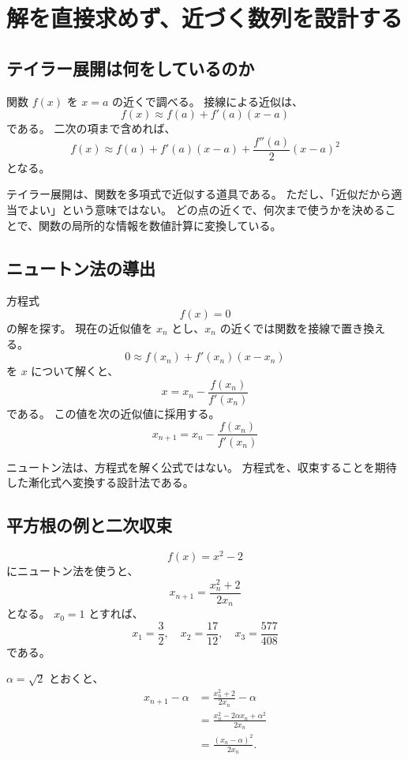 
\section{解を直接求めず、近づく数列を設計する}

\subsection{テイラー展開は何をしているのか}

関数 $f(x)$ を $x=a$ の近くで調べる。
接線による近似は、
\[
  f(x)\approx f(a)+f'(a)(x-a)
\]
である。
二次の項まで含めれば、
\[
  f(x)
  \approx f(a)+f'(a)(x-a)
  +\frac{f''(a)}{2}(x-a)^2
\]
となる。

テイラー展開は、関数を多項式で近似する道具である。
ただし、「近似だから適当でよい」という意味ではない。
どの点の近くで、何次まで使うかを決めることで、関数の局所的な情報を数値計算に変換している。

\subsection{ニュートン法の導出}

方程式
\[
  f(x)=0
\]
の解を探す。
現在の近似値を $x_n$ とし、$x_n$ の近くでは関数を接線で置き換える。
\[
  0\approx f(x_n)+f'(x_n)(x-x_n)
\]
を $x$ について解くと、
\[
  x=x_n-\frac{f(x_n)}{f'(x_n)}
\]
である。
この値を次の近似値に採用する。
\[
  x_{n+1}=x_n-\frac{f(x_n)}{f'(x_n)}
\]

ニュートン法は、方程式を解く公式ではない。
方程式を、収束することを期待した漸化式へ変換する設計法である。

\subsection{平方根の例と二次収束}

\[
  f(x)=x^2-2
\]
にニュートン法を使うと、
\[
  x_{n+1}=\frac{x_n^2+2}{2x_n}
\]
となる。
$x_0=1$ とすれば、
\[
  x_1=\frac32,\quad
  x_2=\frac{17}{12},\quad
  x_3=\frac{577}{408}
\]
である。

$\alpha=\sqrt2$ とおくと、
\[
  \begin{aligned}
    x_{n+1}-\alpha
     & =\frac{x_n^2+2}{2x_n}-\alpha             \\
     & =\frac{x_n^2-2\alpha x_n+\alpha^2}{2x_n} \\
     & =\frac{(x_n-\alpha)^2}{2x_n}.
  \end{aligned}
\]

